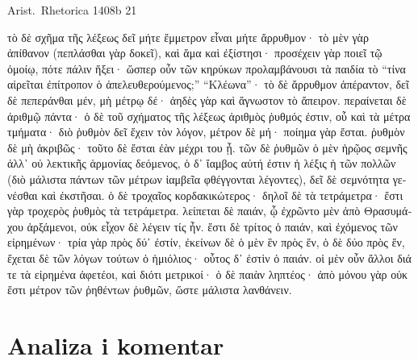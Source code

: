 Arist.\ Rhetorica 1408b 21


\medskip

{\large
\begin{greek}
\noindent τὸ δὲ σχῆμα τῆς λέξεως δεῖ μήτε ἔμμετρον εἶναι μήτε ἄρρυθμον· τὸ μὲν γὰρ ἀπίθανον (πεπλάσθαι γὰρ δοκεῖ), καὶ ἅμα καὶ ἐξίστησι· προσέχειν γὰρ ποιεῖ τῷ ὁμοίῳ, πότε πάλιν ἥξει· ὥσπερ οὖν τῶν κηρύκων προλαμβάνουσι τὰ παιδία τὸ “τίνα αἱρεῖται ἐπίτροπον ὁ ἀπελευθερούμενος;” “Κλέωνα”· τὸ δὲ ἄρρυθμον ἀπέραντον, δεῖ δὲ πεπεράνθαι μέν, μὴ μέτρῳ δέ· ἀηδὲς γὰρ καὶ ἄγνωστον τὸ ἄπειρον. περαίνεται δὲ ἀριθμῷ πάντα· ὁ δὲ τοῦ σχήματος τῆς λέξεως ἀριθμὸς ῥυθμός ἐστιν, οὗ καὶ τὰ μέτρα τμήματα· διὸ ῥυθμὸν δεῖ ἔχειν τὸν λόγον, μέτρον δὲ μή· ποίημα γὰρ ἔσται. ῥυθμὸν δὲ μὴ ἀκριβῶς· τοῦτο δὲ ἔσται ἐὰν μέχρι του ᾖ. τῶν δὲ ῥυθμῶν ὁ μὲν ἡρῷος σεμνῆς ἀλλ᾽ οὐ λεκτικῆς ἁρμονίας δεόμενος, ὁ δ᾽ ἴαμβος αὐτή ἐστιν ἡ λέξις ἡ τῶν πολλῶν (διὸ μάλιστα πάντων τῶν μέτρων ἰαμβεῖα φθέγγονται λέγοντες), δεῖ δὲ σεμνότητα γενέσθαι καὶ ἐκστῆσαι. ὁ δὲ τροχαῖος κορδακικώτερος· δηλοῖ δὲ τὰ τετράμετρα· ἔστι γὰρ τροχερὸς ῥυθμὸς τὰ τετράμετρα. λείπεται δὲ παιάν, ᾧ ἐχρῶντο μὲν ἀπὸ Θρασυμάχου ἀρξάμενοι, οὐκ εἶχον δὲ λέγειν τίς ἦν. ἔστι δὲ τρίτος ὁ παιάν, καὶ ἐχόμενος τῶν εἰρημένων· τρία γὰρ πρὸς δύ᾽ ἐστίν, ἐκείνων δὲ ὁ μὲν ἓν πρὸς ἕν, ὁ δὲ δύο πρὸς ἕν, ἔχεται δὲ τῶν λόγων τούτων ὁ ἡμιόλιος· οὗτος δ᾽ ἐστὶν ὁ παιάν. οἱ μὲν οὖν ἄλλοι διά τε τὰ εἰρημένα ἀφετέοι, καὶ διότι μετρικοί· ὁ δὲ παιὰν ληπτέος· ἀπὸ μόνου γὰρ οὐκ ἔστι μέτρον τῶν ῥηθέντων ῥυθμῶν, ὥστε μάλιστα λανθάνειν.

\end{greek}
}

\newpage

\section*{Analiza i komentar}


